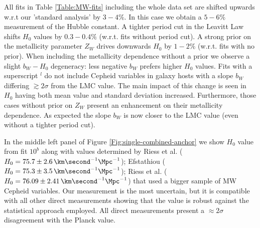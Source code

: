 All fits in Table \ref{Table:MW-fits} including the whole data set are shifted upwards w.r.t our 'standard analysis' by $3-4\%$. In this case we obtain a $5-6\%$ measurement of the Hubble constant. A tighter period cut in the Leavitt Law shifts $H_0$ values by $0.3-0.4\%$ (w.r.t. fits without period cut). A strong prior on the metallicity parameter $Z_W$ drives downwards $H_0$ by $1-2\%$ (w.r.t. fits with no prior). When including the metallicity dependence without a prior we observe a slight $b_W-H_0$ degeneracy: less negative $b_W$ prefers higher $H_0$ values. Fits with a superscript $^l$ do not include Cepheid variables in galaxy hosts with a slope $b_W$ differing $\gtrsim 2\sigma$ from the LMC value. The main impact of this change is seen in $H_0$ having both mean value and standard deviation increased. Furthermore, those cases without prior on $Z_W$ present an enhancement on their metallicity dependence. As expected the slope $b_W$ is now closer to the LMC value (even without a tighter period cut).

In the middle left panel of Figure \ref{Fig:single-combined-anchor} we show $H_0$ value from fit $10^b$ along with values determined by Riess et al. \cite{Riess:2011yx} ($H_0=75.7\pm 2.6 \, \km \second^{-1} \Mpc^{-1}$); Efstathiou  \cite{Efstathiou:2013via} ($H_0 = 75.3 \pm 3.5 \, \km \second^{-1} \Mpc^{-1}$); Riess et al. \cite{Riess:2016jrr} ($H_0=76.09\pm 2.41 \, \km \second^{-1} \Mpc^{-1}$) that used a bigger sample of MW Cepheid variables. Our measurement is the most uncertain, but it is compatible with all other direct measurements showing that the value is robust against the statistical approach employed. All direct measurements present a $\approx 2\sigma$ disagreement with the Planck value.

